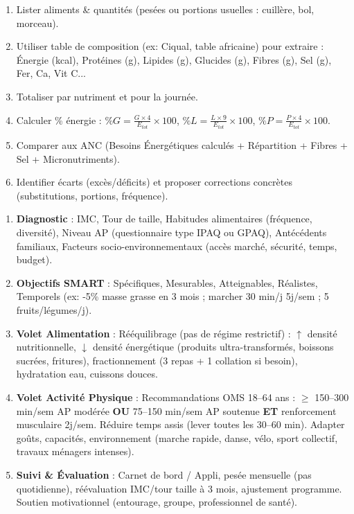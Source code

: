 \documentclass[11pt]{article}
\begin{document}
\begin{bilan}
\begin{methode}
\begin{enumerate}
    \item Lister aliments \& quantités (pesées ou portions usuelles : cuillère, bol, morceau).
    \item Utiliser table de composition (ex: Ciqual, table africaine) pour extraire : Énergie (kcal), Protéines (g), Lipides (g), Glucides (g), Fibres (g), Sel (g), Fer, Ca, Vit C...
    \item Totaliser par nutriment et pour la journée.
    \item Calculer \% énergie : $\%G = \frac{G \times 4}{E_{tot}} \times 100$, $\%L = \frac{L \times 9}{E_{tot}} \times 100$, $\%P = \frac{P \times 4}{E_{tot}} \times 100$.
    \item Comparer aux ANC (Besoins Énergétiques calculés + Répartition + Fibres + Sel + Micronutriments).
    \item Identifier écarts (excès/déficits) et proposer corrections concrètes (substitutions, portions, fréquence).
\end{enumerate}
\end{methode}

\begin{methode}
\begin{enumerate}
    \item \textbf{Diagnostic} : IMC, Tour de taille, Habitudes alimentaires (fréquence, diversité), Niveau AP (questionnaire type IPAQ ou GPAQ), Antécédents familiaux, Facteurs socio-environnementaux (accès marché, sécurité, temps, budget).
    \item \textbf{Objectifs SMART} : Spécifiques, Mesurables, Atteignables, Réalistes, Temporels (ex: -5\% masse grasse en 3 mois ; marcher 30 min/j 5j/sem ; 5 fruits/légumes/j).
    \item \textbf{Volet Alimentation} : Rééquilibrage (pas de régime restrictif) : $\uparrow$ densité nutritionnelle, $\downarrow$ densité énergétique (produits ultra-transformés, boissons sucrées, fritures), fractionnement (3 repas + 1 collation si besoin), hydratation eau, cuissons douces.
    \item \textbf{Volet Activité Physique} : Recommandations OMS 18--64 ans : $\ge$ 150--300 min/sem AP modérée \textbf{OU} 75--150 min/sem AP soutenue \textbf{ET} renforcement musculaire 2j/sem. Réduire temps assis (lever toutes les 30--60 min). Adapter goûts, capacités, environnement (marche rapide, danse, vélo, sport collectif, travaux ménagers intenses).
    \item \textbf{Suivi \& Évaluation} : Carnet de bord / Appli, pesée mensuelle (pas quotidienne), réévaluation IMC/tour taille à 3 mois, ajustement programme. Soutien motivationnel (entourage, groupe, professionnel de santé).
\end{enumerate}
\end{methode}
\end{bilan}
\end{document}
